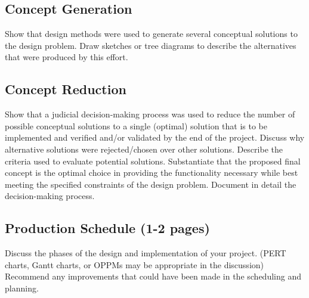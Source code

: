 \documentclass[12pt]{article}
\begin{document}
\subsection{Concept Generation}
Show that design methods were used to generate several conceptual solutions to the design problem. Draw sketches or tree diagrams to describe the alternatives that were produced by this effort.

\subsection{Concept Reduction}
Show that a judicial decision-making process was used to reduce the number of possible conceptual solutions to a single (optimal) solution that is to be implemented and verified and/or validated by the end of the project. Discuss why alternative solutions were rejected/chosen over other solutions. Describe the criteria used to evaluate potential solutions. Substantiate that the proposed final concept is the optimal choice in providing the functionality necessary while best meeting the specified constraints of the design problem. Document in detail the decision-making process.

\subsection{Production Schedule (1-2 pages)}
Discuss the phases of the design and implementation of your project. (PERT charts, Gantt charts, or OPPMs may be appropriate in the discussion) Recommend any improvements that could have been made in the scheduling and planning.

\end{document}
